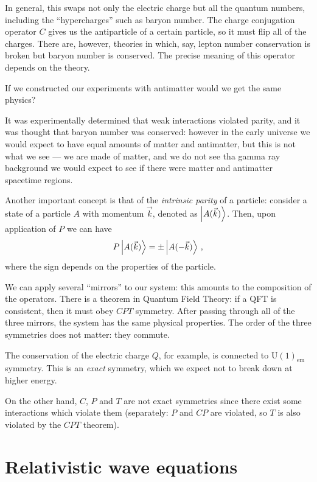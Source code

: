 \documentclass[main.tex]{subfiles}
\begin{document}
In general, this swaps not only the electric charge but all the quantum numbers, including the ``hypercharges'' such as baryon number.
The charge conjugation operator \(C\) gives us the antiparticle of a certain particle, so it must flip all of the charges. 
There are, however, theories in which, say, lepton number conservation is broken but baryon number is conserved. The precise meaning of this operator depends on the theory. 

If we constructed our experiments with antimatter would we get the same physics? 

It was experimentally determined that weak interactions violated parity, and it was thought that baryon number was conserved: however in the early universe we would expect to have equal amounts of matter and antimatter, but this is not what we see --- we are made of matter, and we do not see tha gamma ray background we would expect to see if there were matter and antimatter spacetime regions. 

Another important concept is that of the \emph{intrinsic parity} of a particle: consider a state of a particle \(A\) with momentum \(\vec{k}\), denoted as \(\ket{A(\vec{k})}\). Then, upon application of \(P\) we can have 
%
\begin{align}
P \ket{A(\vec{k})} = \pm \ket{A(-\vec{k})}
\,,
\end{align}
%
where the sign depends on the properties of the particle.

We can apply several ``mirrors'' to our system: this amounts to the composition of the operators. 
There is a theorem in Quantum Field Theory: if a QFT is consistent, then it must obey \(CPT\) symmetry. 
After passing through all of the three mirrors, the system has the same physical properties. 
The order of the three symmetries does not matter: they commute. 

The conservation of the electric charge \(Q\), for example, is connected to \(\mathrm{U}(1)_{\text{em}}\) symmetry. 
This is an \emph{exact} symmetry, which we expect not to break down at higher energy. 

On the other hand, \(C\), \(P\) and \(T\) are not exact symmetries since there exist some interactions which violate them (separately: \(P\) and \(CP\) are violated, so \(T\) is also violated by the \(CPT\) theorem). 

\section{Relativistic wave equations}
\end{document}

